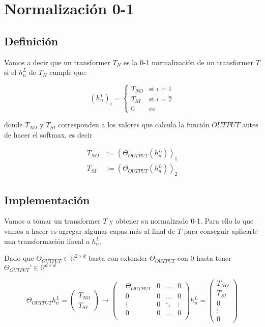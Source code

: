 \section*{Normalización 0-1}

\subsection*{Definición}

Vamos a decir que un transformer $T_N$ es la 0-1 normalización de un transformer $T$ si el $h_n^L$ de $T_N$ cumple que:

\begin{equation*}
(h_n^L)_i =
\begin{cases}
T_{NO} & \text{si } i = 1 \\
T_{SI} & \text{si } i = 2 \\
0 & \text{cc }
\end{cases}
\end{equation*}

donde $T_{NO}$ y $T_{SI}$ corresponden a los valores que calcula la función $OUTPUT$ antes de hacer el softmax, es decir 

\begin{align*}
    T_{NO} &:= (\Theta_{OUTPUT}(h_n^L))_1 \\
    T_{SI} &:= (\Theta_{OUTPUT}(h_n^L))_2 
\end{align*}


\subsection*{Implementación}

Vamos a tomar un transformer $T$ y obtener su normalizado 0-1. Para ello lo que vamos a hacer es agregar algunas capas más al final de $T$ para conseguir aplicarle una transformación lineal a $h_n^L$.

Dado que $\Theta_{OUTPUT} \in \mathbb{R}^{2\times d}$ basta con extender $\Theta_{OUTPUT}$ con $0$ hasta tener $\Theta_{OUTPUT}' \in \mathbb{R}^{d\times d}$


\begin{equation*}
    \Theta_{OUTPUT}h_n^L =   
    \left(\begin{matrix}
        T_{NO} \\
        T_{SI}
    \end{matrix}\right) \longrightarrow
    \left(\begin{matrix}
        &\Theta_{OUTPUT} &0 &\dots  &0 \\
        &0                &0 &\dots  &0 \\
        &\vdots           &0 &\ddots &\vdots \\
        &0                &0 &\dots  &0 \\
    \end{matrix}\right)h_n^L = 
    \left(\begin{matrix}
        T_{NO} \\
        T_{SI} \\ 
        0 \\
        \vdots \\
        0
    \end{matrix}\right)
\end{equation*}


